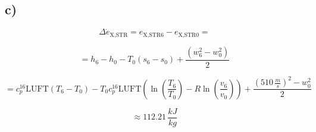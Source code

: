

\subsection*{c)}

\[
\Delta \dot{e}_{\text{X,STR}} = e_{\text{X,STR6}} - e_{\text{X,STR0}} = 
\]

\[
= h_6 - h_0 - T_0 (s_6 - s_0) + \frac{(w_6^2 - w_0^2)}{2}
\]

\[
= c_p^{16} \text{LUFT} (T_6 - T_0) - T_0 c_p^{16} \text{LUFT} \left( \ln \left( \frac{T_6}{T_0} \right) - R \ln \left( \frac{v_6}{v_0} \right) \right) + \frac{(510 \, \frac{m}{s})^2 - w_0^2}{2}
\]

\[
\approx 112.21 \, \frac{kJ}{kg}
\]
